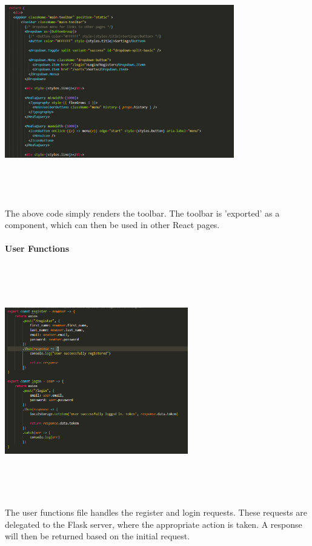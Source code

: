 \begin{center}
    \includegraphics[width=10cm,height=10cm,keepaspectratio]{images/toolbar2}
\end{center}
The above code simply renders the toolbar. The toolbar is 'exported' as a component, which can then be used in other React pages.

\newpage
\paragraph{User Functions}
\begin{center}
    \includegraphics[width=8cm,height=10cm,keepaspectratio]{images/userfuncs}
\end{center}
The user functions file handles the register and login requests. These requests are delegated to the Flask server, where the appropriate action is taken. A response will then be returned based on the initial request.

